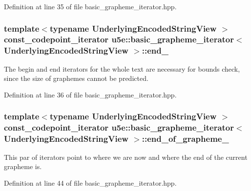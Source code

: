 Definition at line 35 of file basic\+\_\+grapheme\+\_\+iterator.\+hpp.

\subsubsection[{\texorpdfstring{end\+\_\+}{end_}}]{\setlength{\rightskip}{0pt plus 5cm}template$<$typename Underlying\+Encoded\+String\+View $>$ {\bf const\+\_\+codepoint\+\_\+iterator} {\bf u5e\+::basic\+\_\+grapheme\+\_\+iterator}$<$ Underlying\+Encoded\+String\+View $>$\+::end\+\_\+}\hypertarget{classu5e_1_1basic__grapheme__iterator_a717e587924ade6d966be95bfe57487a3}{}\label{classu5e_1_1basic__grapheme__iterator_a717e587924ade6d966be95bfe57487a3}
The begin and end iterators for the whole text are necessary for bounds check, since the size of graphemes cannot be predicted. 

Definition at line 36 of file basic\+\_\+grapheme\+\_\+iterator.\+hpp.

\subsubsection[{\texorpdfstring{end\+\_\+of\+\_\+grapheme\+\_\+}{end_of_grapheme_}}]{\setlength{\rightskip}{0pt plus 5cm}template$<$typename Underlying\+Encoded\+String\+View $>$ {\bf const\+\_\+codepoint\+\_\+iterator} {\bf u5e\+::basic\+\_\+grapheme\+\_\+iterator}$<$ Underlying\+Encoded\+String\+View $>$\+::end\+\_\+of\+\_\+grapheme\+\_\+}\hypertarget{classu5e_1_1basic__grapheme__iterator_a74489f73ba6c645254bf28a6e2c42946}{}\label{classu5e_1_1basic__grapheme__iterator_a74489f73ba6c645254bf28a6e2c42946}
This par of iterators point to where we are now and where the end of the current grapheme is. 

Definition at line 44 of file basic\+\_\+grapheme\+\_\+iterator.\+hpp.

